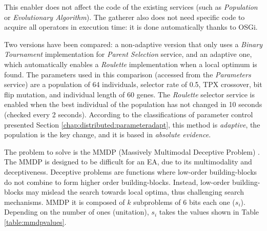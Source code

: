 This enabler does not affect the code of the existing services (such as {\em Population} or {\em Evolutionary Algorithm}). The gatherer also does not need specific code to acquire all operators in execution time: it is done automatically thanks to
OSGi. %

Two versions have been compared: a non-adaptive version that only uses a {\em Binary Tournament} implementation for {\em Parent Selection} service, and an adaptive one, which automatically enables a {\em Roulette} implementation when a local optimum is found. The parameters used in this comparison (accessed from the {\em Parameters} service) are a population of 64 individuals, selector rate of 0.5, TPX crossover, bit flip mutation, and individual length of 60 genes. The {\em Roulette} selector service is enabled when the best individual of the population has not changed in 10 seconds (checked every 2 seconds). According to the classifications of parameter control presented Section \ref{chap:distributed:parameteradapt}, this method is {\em adaptive}, the population is the key change, and it is based in {\em absolute evidence}. 

The problem to solve is the MMDP (Massively Multimodal Deceptive Problem) \cite{goldberg92massive}. The MMDP is designed to be difficult for an EA, due to
its multimodality and deceptiveness. Deceptive problems are functions where low-order building-blocks do not combine to form higher order building-blocks. Instead, low-order building-blocks may mislead the search towards local optima, thus challenging search mechanisms. MMDP it is composed of $k$ subproblems of 6 bits each one ($s_i$). Depending on
the number of ones (unitation), $s_i$ takes the values shown in Table \ref{table:mmdpvalues}.  

\begin{table}
\caption{ Basic deceptive bipolar function ($s_i$) for M\-M\-D\-P.}
\label{table:mmdpvalues} %

\end{table}



